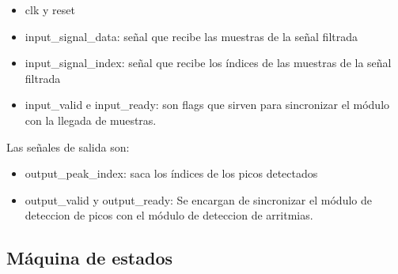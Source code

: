     \begin{itemize}
    \item clk y reset
    \item input\_signal\_data: señal que recibe las muestras de la señal filtrada 
    \item input\_signal\_index: señal que recibe los índices de las muestras de la señal filtrada 
    \item input\_valid e input\_ready: son flags que sirven para sincronizar el módulo con la llegada de muestras. 
    \end{itemize}
    
    Las señales de salida son:
    
    \begin{itemize}
        \item output\_peak\_index: saca los índices de los picos detectados
        \item output\_valid y output\_ready: Se encargan de sincronizar el módulo de deteccion de picos 
        con el módulo de deteccion de arritmias.
    \end{itemize}

\subsection{Máquina de estados}

